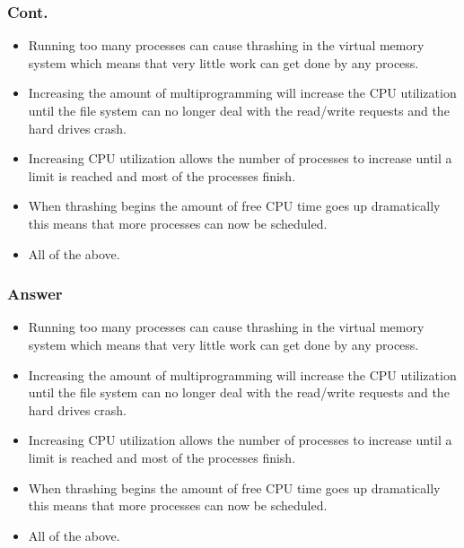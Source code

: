 \documentclass{beamer}
\begin{document}
\begin{frame}
  \frametitle{Cont.}
  \begin{itemize}
    \item Running too many processes can cause thrashing in the virtual memory system which means that very little work can get done by any process.
    \item Increasing the amount of multiprogramming will increase the CPU utilization until the file system can no longer deal with the read/write requests and the hard drives crash.
    \item Increasing CPU utilization allows the number of processes to increase until a limit is reached and most of the processes finish.
    \item When thrashing begins the amount of free CPU time goes up dramatically this means that more processes can now be scheduled.
    \item All of the above.
  \end{itemize}
\end{frame}
\begin{frame}
  \frametitle{Answer}
  \begin{itemize}
    \item<alert@+|+-> Running too many processes can cause thrashing in the virtual memory system which means that very little work can get done by any process.
    \item Increasing the amount of multiprogramming will increase the CPU utilization until the file system can no longer deal with the read/write requests and the hard drives crash.
    \item Increasing CPU utilization allows the number of processes to increase until a limit is reached and most of the processes finish.
    \item When thrashing begins the amount of free CPU time goes up dramatically this means that more processes can now be scheduled.
    \item All of the above.
  \end{itemize}
\end{frame}
\end{document}
